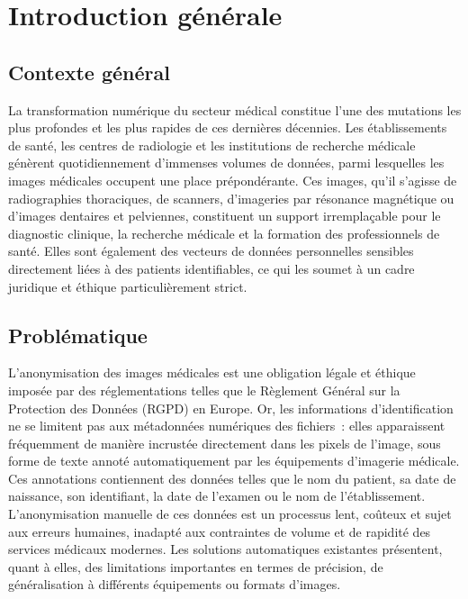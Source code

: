 \chapter*{Introduction générale}

\section*{Contexte général}

La transformation numérique du secteur médical constitue l'une des mutations les plus profondes et les plus rapides de ces dernières décennies. Les établissements de santé, les centres de radiologie et les institutions de recherche médicale génèrent quotidiennement d'immenses volumes de données, parmi lesquelles les images médicales occupent une place prépondérante. Ces images, qu'il s'agisse de radiographies thoraciques, de scanners, d'imageries par résonance magnétique ou d'images dentaires et pelviennes, constituent un support irremplaçable pour le diagnostic clinique, la recherche médicale et la formation des professionnels de santé. Elles sont également des vecteurs de données personnelles sensibles directement liées à des patients identifiables, ce qui les soumet à un cadre juridique et éthique particulièrement strict.

\section*{Problématique}

L'anonymisation des images médicales est une obligation légale et éthique imposée par des réglementations telles que le Règlement Général sur la Protection des Données (RGPD) en Europe. Or, les informations d'identification ne se limitent pas aux métadonnées numériques des fichiers~: elles apparaissent fréquemment de manière incrustée directement dans les pixels de l'image, sous forme de texte annoté automatiquement par les équipements d'imagerie médicale. Ces annotations contiennent des données telles que le nom du patient, sa date de naissance, son identifiant, la date de l'examen ou le nom de l'établissement. L'anonymisation manuelle de ces données est un processus lent, coûteux et sujet aux erreurs humaines, inadapté aux contraintes de volume et de rapidité des services médicaux modernes. Les solutions automatiques existantes présentent, quant à elles, des limitations importantes en termes de précision, de généralisation à différents équipements ou formats d'images.


